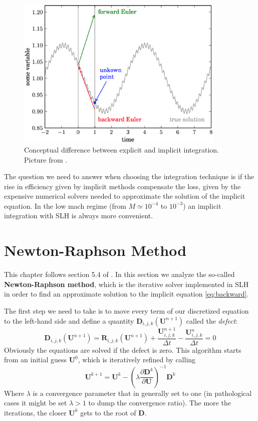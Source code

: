\begin{figure}[t]
\centering
\includegraphics[width=10cm]{./img/implicit}
\caption{Conceptual difference between explicit and implicit integration. Picture from \citet{miczek}.}
\label{fig:implicit}
\centering
\end{figure}
The question we need to answer when choosing the integration technique is if the rise in efficiency given by implicit methods compensate the loss, given by the expensive numerical solvers needed to approximate the solution of the implicit equation. In the low mach regime (from $M \simeq 10^{-4}$ to $10^{-3}$) an implicit integration with SLH is always more convenient. 

\section{Newton-Raphson Method}
This chapter follows section 5.4 of \citet{miczek}.
In this section we analyze the so-called \textbf{Newton-Raphson method}, which is the iterative solver implemented in SLH in order to find an approximate solution to the implicit equation \ref{eq:backward}. 

The first step we need to take is to move every term of our discretized equation to the left-hand side and define a quantity $\mathbf{D}_{i, j, k}(\mathbf{U}^{n+1})$ called the \textit{defect}:
\begin{equation}\label{eq:defect}
	\mathbf{D}_{i, j, k}(\mathbf{U}^{n+1}) = \mathbf{R}_{i, j, k}(\mathbf{U}^{n+1}) + \frac{\mathbf{U}_{i, j, k}^{n+1}}{\Delta t} - \frac{\mathbf{U}^n_{i, j, k}}{\Delta t} = 0
\end{equation}
Obviously the equations are solved if the defect is zero. This algorithm starts from an initial guess $\mathbf{U}^0$, which is iteratively refined by calling
\begin{equation}\label{eq:newtonraphson}
	\mathbf{U}^{k+1} = \mathbf{U}^k - \left( \lambda \frac{\partial \mathbf{D}^k}{\partial \mathbf{U}}  \right)^{-1} \mathbf{D}^k
\end{equation}
Where $\lambda$ is a convergence parameter that in generally set to one (in pathological cases it might be set $\lambda > 1$ to dump the convergence ratio). The more the iterations, the closer $\mathbf{U}^k$ gets to the root of $\mathbf{D}$.

